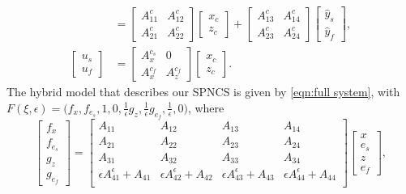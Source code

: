 \begin{equation}
\begin{aligned}
    &=
    \left[ \begin{smallmatrix}
        A_{11}^c & A_{12}^c \\ A_{21}^c & A_{22}^c
    \end{smallmatrix} \right]
    \left[ \begin{smallmatrix}
        x_c \\ z_c
    \end{smallmatrix} \right] 
    + 
    \left[ \begin{smallmatrix}
        A_{13}^c & A_{14}^c \\ A_{23}^c & A_{24}^c
    \end{smallmatrix} \right]
    \left[ \begin{smallmatrix}
        \hat{y}_s \\ \hat{y}_f
    \end{smallmatrix} \right],
    \\
    \left[ \begin{smallmatrix}
        u_s \\ u_f
    \end{smallmatrix} \right]
    &=
    \left[ \begin{smallmatrix}
        A_x^{c_s} & 0 \\ A_x^{c_f} & A_z^{c_f}
    \end{smallmatrix} \right]
    \left[ \begin{smallmatrix}
        x_c \\ z_c
    \end{smallmatrix} \right].
\end{aligned}
\label{eqn: linear plant and controller}
\end{equation}
%
%
%
%
The hybrid model that describes our SPNCS is given by \eqref{eqn:full system}, with $F(\xi, \epsilon) =  \big(f_x,f_{e_s},1,0,\tfrac{1}{\epsilon}g_z, \tfrac{1}{\epsilon} g_{e_f},  \frac{1}{\epsilon},0\big)$, where
\begin{equation*}
    \left[\begin{smallmatrix}
        f_x \\ f_{e_s} \\ g_z \\ g_{e_f}
    \end{smallmatrix} \right]
    =
    \left[\begin{smallmatrix}
        A_{11} & A_{12} & A_{13} & A_{14} \\
        A_{21} & A_{22} & A_{23} & A_{24} \\
        A_{31} & A_{32} & A_{33} & A_{34} \\
        \epsilon A_{41}^\epsilon + A_{41} & \epsilon A_{42}^\epsilon + A_{42} & \epsilon A_{43}^\epsilon + A_{43} & \epsilon A_{44}^\epsilon + A_{44} \\
    \end{smallmatrix}\right]
    \left[\begin{smallmatrix}
        x \\ e_s \\  z \\  e_f
    \end{smallmatrix}\right],
\end{equation*}
